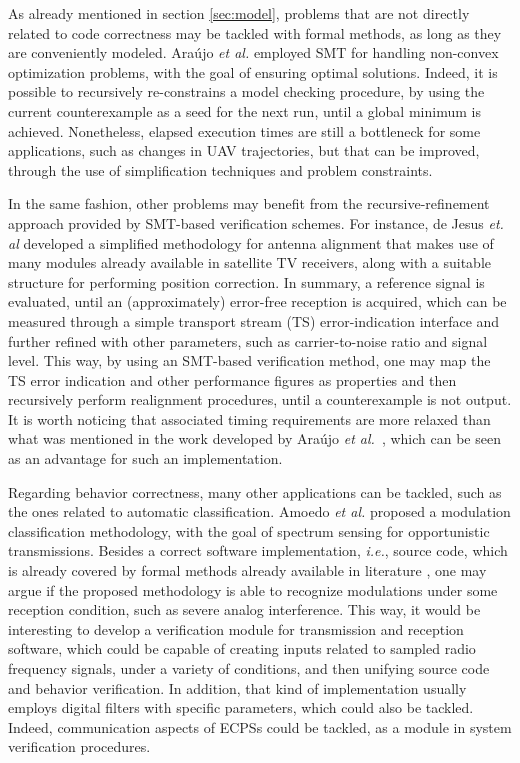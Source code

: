 \documentclass[format=acmsmall, review=false, screen=true]{acmart}
\begin{document}
{{As already mentioned in section \ref{sec:model}, problems that are not directly related to code correctness may be tackled with formal methods, as long as they are conveniently modeled. Ara\'ujo {\it et al.} \cite{Araujo16} employed SMT for handling non-convex optimization problems, with the goal of ensuring optimal solutions. Indeed, it is possible to recursively re-constrains a model checking procedure, by using the current counterexample as a seed for the next run, until a global minimum is achieved. Nonetheless, elapsed execution times are still a bottleneck for some applications, such as changes in UAV trajectories, but that can be improved, through the use of simplification techniques and problem constraints.

In the same fashion, other problems may benefit from the recursive-refinement approach provided by SMT-based verification schemes. For instance, de Jesus {\it et. al} \cite{antennasbrt} developed a simplified methodology for antenna alignment that makes use of many modules already available in satellite TV receivers, along with a suitable structure for performing position correction. In summary, a reference signal is evaluated, until an (approximately) error-free reception is acquired, which can be measured through a simple transport stream (TS) error-indication interface and further refined with other parameters, such as carrier-to-noise ratio and signal level. This way, by using an SMT-based verification method, one may map the TS error indication and other performance figures as properties and then recursively perform realignment procedures, until a counterexample is not output. It is worth noticing that associated timing requirements are more relaxed than what was mentioned in the work developed by Ara\'ujo {\it et al.}~\cite{Araujo16}, which can be seen as an advantage for such an implementation.

Regarding behavior correctness, many other applications can be tackled, such as the ones related to automatic classification. Amoedo {\it et al.} \cite{amoedo} proposed a modulation classification methodology, with the goal of spectrum sensing for opportunistic transmissions. Besides a correct software implementation, {\it i.e.}, source code, which is already covered by formal methods already available in literature \cite{esbmc_filter,Cordeiro12,Clarke04}, one may argue if the proposed methodology is able to recognize modulations under some reception condition, such as severe analog interference. This way, it would be interesting to develop a verification module for transmission and reception software, which could be capable of creating inputs related to sampled radio frequency signals, under a variety of conditions, and then unifying source code and behavior verification. In addition, that kind of implementation usually employs digital filters with specific parameters, which could also be tackled. Indeed, communication aspects of ECPSs could be tackled, as a module in system verification procedures.

}}
\end{document}
